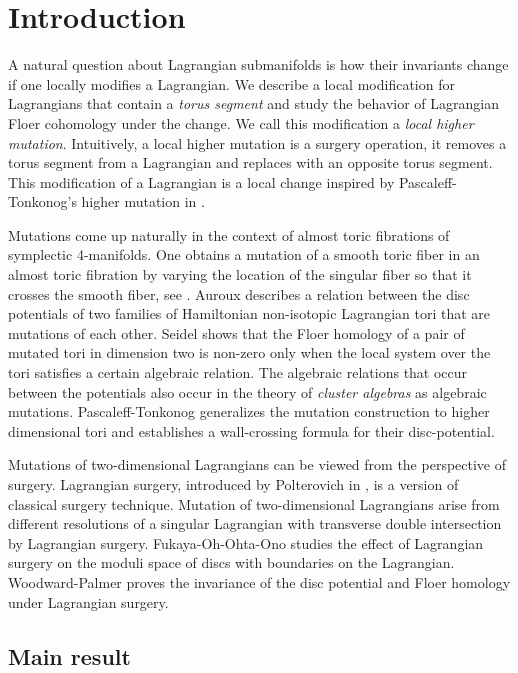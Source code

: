\section{Introduction}\label{sec:intro}

A natural question about Lagrangian submanifolds is how their invariants change if one locally modifies a Lagrangian.   We describe a local modification for Lagrangians that contain a \textit{torus segment}  and study the behavior of Lagrangian Floer cohomology under the change.  We call this modification a \textit{local higher mutation}.   Intuitively,  a local higher mutation is a surgery operation, it removes a torus segment from a Lagrangian and replaces with an opposite torus segment.  This modification of a Lagrangian is a local change inspired by Pascaleff-Tonkonog's higher mutation in \cite{wall}. 

Mutations come up naturally in the context of almost toric fibrations of symplectic 4-manifolds.  One obtains a mutation of a smooth toric fiber in an almost toric fibration by varying the location of the singular fiber so that it crosses the smooth fiber, see \cite{leungsym:almosttor}. Auroux \cite{aurTdual} describes a relation between the disc potentials of two families of Hamiltonian non-isotopic Lagrangian tori that are mutations of each other. Seidel \cite{seidelLC}  shows that the Floer homology of a pair of mutated tori in dimension two is non-zero only when the local system over the tori satisfies a certain algebraic relation.  The algebraic relations that occur between the potentials also occur in the theory of \textit{cluster algebras} as algebraic mutations.  Pascaleff-Tonkonog  \cite{wall} generalizes the mutation construction to higher dimensional tori and establishes a wall-crossing formula for their disc-potential.  

Mutations of two-dimensional Lagrangians can be viewed from the perspective of surgery.  Lagrangian surgery, introduced by Polterovich in \cite{pol:surg}, is a version of classical surgery technique.  Mutation of two-dimensional Lagrangians arise from different resolutions of a singular Lagrangian with transverse double intersection by Lagrangian surgery.  Fukaya-Oh-Ohta-Ono \cite{ch10} studies the effect of Lagrangian surgery on the moduli space of discs with boundaries on the Lagrangian.  Woodward-Palmer \cite{palmerwoodwardsurg} proves the invariance of the disc potential and Floer homology under Lagrangian surgery.


 \subsection{Main result}


